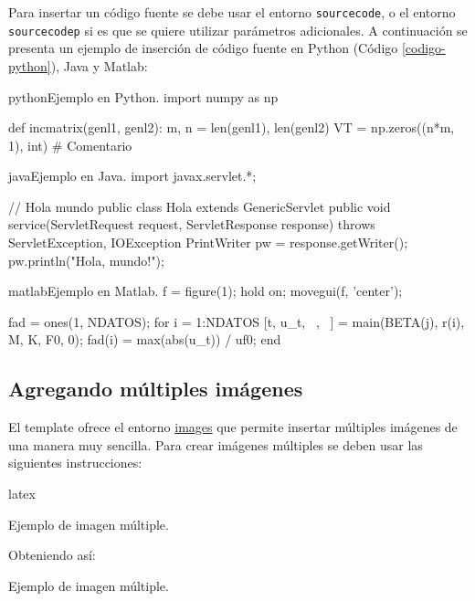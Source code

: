 	Para insertar un código fuente se debe usar el entorno \texttt{sourcecode}, o el entorno \texttt{sourcecodep} si es que se quiere utilizar parámetros adicionales. A continuación se presenta un ejemplo de inserción de código fuente en Python (Código \ref{codigo-python}), Java y Matlab:

\begin{sourcecode}[\label{codigo-python}]{python}{Ejemplo en Python.}
import numpy as np

def incmatrix(genl1, genl2):
	m, n = len(genl1), len(genl2)
	VT = np.zeros((n*m, 1), int) # Comentario
\end{sourcecode}

\begin{sourcecode}[]{java}{Ejemplo en Java.}
import javax.servlet.*;

// Hola mundo
public class Hola extends GenericServlet {
	public void service(ServletRequest request, ServletResponse response)
	throws ServletException, IOException{
		PrintWriter pw = response.getWriter();
		pw.println("Hola, mundo!");
	}
}
\end{sourcecode}

\begin{sourcecode}{matlab}{Ejemplo en Matlab.}
f = figure(1); hold on; movegui(f, 'center');

fad = ones(1, NDATOS); %
for i = 1:NDATOS
	[t, u_t, ~, ~] = main(BETA(j), r(i), M, K, F0, 0);
	fad(i) = max(abs(u_t)) / uf0;
end
\end{sourcecode}

\subsection{Agregando múltiples imágenes}

	El template ofrece el entorno \href{https://latex.ppizarror.com/informe#hlp-images}{images} que permite insertar múltiples imágenes de una manera muy sencilla. Para crear imágenes múltiples se deben usar las siguientes instrucciones:

\begin{sourcecode}{latex}{}
\begin{images}[\label{imagenmultiple}]{Ejemplo de imagen múltiple.}
	\imagesnewline
\end{images}
\end{sourcecode}

	Obteniendo así: \\

	\begin{images}{Ejemplo de imagen múltiple.}
		\imagesnewline
	\end{images}

